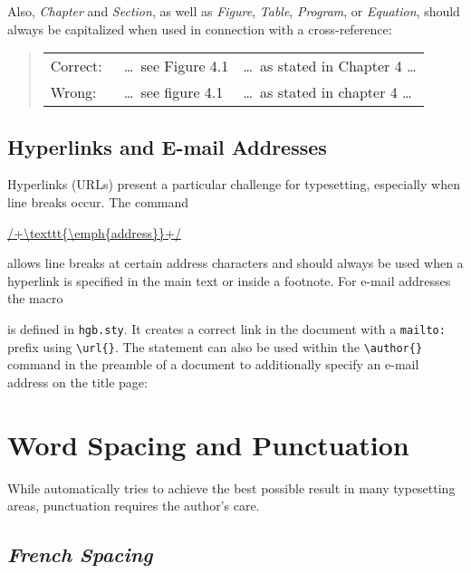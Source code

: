 %
Also, \emph{Chapter} and \emph{Section}, as well as \emph{Figure}, \emph{Table},
\emph{Program}, or \emph{Equation}, should always be capitalized when used in
connection with a cross-reference:
%
\begin{quote}
	\begin{tabular}{lll}
		\textrm{Correct:\ } & \ldots\ see Figure 4.1 & \ldots\ as stated in
		Chapter 4 \ldots \\
		\textrm{Wrong:\ }  & \ldots\ see figure 4.1  & \ldots\ as stated in
		chapter 4 \ldots
	\end{tabular}
\end{quote}

\subsection{Hyperlinks and E-mail Addresses}

Hyperlinks (URLs) present a particular challenge for typesetting, especially
when line breaks occur. The command
%
\begin{LaTeXCode}[numbers=none]
\url{/+\texttt{\emph{address}}+/}
\end{LaTeXCode}
%
allows line breaks at certain address characters and should always be used when a
hyperlink is specified in the main text or inside a footnote.
%
For e-mail addresses the macro
%
\begin{LaTeXCode}[numbers=none]
\end{LaTeXCode}
%
is defined in \texttt{hgb.sty}. It creates a correct link in the document with
a \texttt{mailto:} prefix using \verb|\url{}|. The statement can also be used
within the \verb|\author{}| command in the preamble of a document to
additionally specify an e-mail address on the title page:
%
\begin{LaTeXCode}[numbers=none]
\author{%
    Alex A. Wiseguy \\%
}
\end{LaTeXCode}



\section{Word Spacing and Punctuation}

While \latex automatically tries to achieve the best possible result in many
typesetting areas, punctuation requires the author's care.

\subsection{\emph{French Spacing}}

